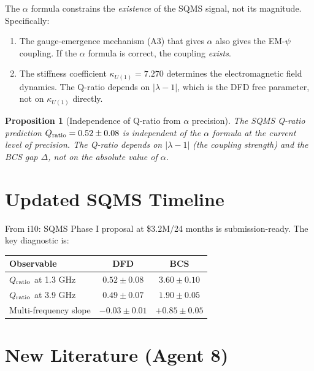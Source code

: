 \documentclass[11pt,a4paper]{article}
\newtheorem{proposition}{Proposition}
\begin{document}
The $\alpha$ formula constrains the \emph{existence} of the SQMS signal, not its magnitude. Specifically:
\begin{enumerate}
\item The gauge-emergence mechanism (A3) that gives $\alpha$ also gives the EM-$\psi$ coupling. If the $\alpha$ formula is correct, the coupling \emph{exists}.
\item The stiffness coefficient $\kappa_{U(1)} = 7.270$ determines the electromagnetic field dynamics. The Q-ratio depends on $|\lambda - 1|$, which is the DFD free parameter, not on $\kappa_{U(1)}$ directly.
\end{enumerate}

\begin{proposition}[Independence of Q-ratio from $\alpha$ precision]
The SQMS Q-ratio prediction $Q_{\rm ratio} = 0.52 \pm 0.08$ is independent of the $\alpha$ formula at the current level of precision. The Q-ratio depends on $|\lambda - 1|$ (the coupling strength) and the BCS gap $\Delta$, not on the absolute value of $\alpha$.
\end{proposition}

\section{Updated SQMS Timeline}

From i10: SQMS Phase I proposal at \$3.2M/24 months is submission-ready. The key diagnostic is:
\begin{center}
\begin{tabular}{lcc}
\toprule
\textbf{Observable} & \textbf{DFD} & \textbf{BCS} \\
\midrule
$Q_{\rm ratio}$ at 1.3 GHz & $0.52 \pm 0.08$ & $3.60 \pm 0.10$ \\
$Q_{\rm ratio}$ at 3.9 GHz & $0.49 \pm 0.07$ & $1.90 \pm 0.05$ \\
Multi-frequency slope & $-0.03 \pm 0.01$ & $+0.85 \pm 0.05$ \\
\bottomrule
\end{tabular}
\end{center}

\section{New Literature (Agent 8)}
\end{document}
